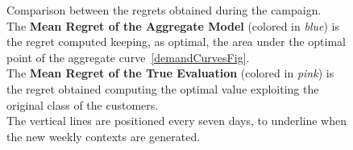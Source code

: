 \begin{figure}[!htb]
    \caption{Comparison between the regrets obtained during the campaign.\\
    The \textbf{Mean Regret of the Aggregate Model} (colored in \textit{blue}) is the regret computed keeping, as optimal, the area under the optimal point of the aggregate curve~\ref{demandCurvesFig}.\\
    The \textbf{Mean Regret of the True Evaluation} (colored in \textit{pink}) is the regret obtained computing the optimal value exploiting the original class of the customers.\\
    The vertical lines are positioned every seven days, to underline when the new weekly contexts are generated.}
    \label{regret5Fig}
\end{figure}
